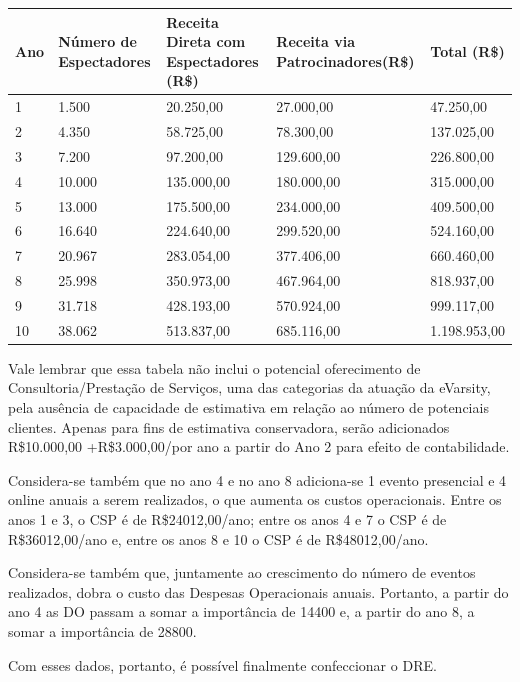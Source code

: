 \documentclass[a4paper, 12pt]{paper}
\begin{document}
\begin{table}[ht]
	\centering
	\begin{tabular}{p{1cm}p{3cm}p{3.5cm}p{3.5cm}p{3cm}}
		\hline
		\cellcolor{gray}Ano&\cellcolor{gray}Número de Espectadores&\cellcolor{gray}Receita Direta com Espectadores (R\$)&\cellcolor{gray}Receita via Patrocinadores(R\$)&\cellcolor{gray}Total (R\$)\\
		\hline
		1&1.500&20.250,00&27.000,00&47.250,00\\
		2&4.350&58.725,00&78.300,00&137.025,00\\
		3&7.200&97.200,00&129.600,00&226.800,00\\	
		4&10.000&135.000,00&180.000,00&315.000,00\\
		5&13.000&175.500,00&234.000,00&409.500,00\\
		6&16.640&224.640,00&299.520,00&524.160,00\\
		7&20.967&283.054,00&377.406,00&660.460,00\\
		8&25.998&350.973,00&467.964,00&818.937,00\\
		9&31.718&428.193,00&570.924,00&999.117,00\\							
		10&38.062&513.837,00&685.116,00&1.198.953,00\\		
		\hline
	\end{tabular}
\end{table}

Vale lembrar que essa tabela não inclui o potencial oferecimento de Consultoria/Prestação de Serviços, uma das categorias da atuação da eVarsity, pela ausência de capacidade de estimativa em relação ao número de potenciais clientes. Apenas para fins de estimativa conservadora, serão adicionados R\$10.000,00 +R\$3.000,00/por ano a partir do Ano 2 para efeito de contabilidade.

Considera-se também que no ano 4 e no ano 8 adiciona-se 1 evento presencial e 4 online anuais a serem realizados, o que aumenta os custos operacionais. Entre os anos 1 e 3, o CSP é de R\$24012,00/ano; entre os anos 4 e 7 o CSP é de R\$36012,00/ano e, entre os anos 8 e 10 o CSP é de R\$48012,00/ano.

Considera-se também que, juntamente ao crescimento do número de eventos realizados, dobra o custo das Despesas Operacionais anuais. Portanto, a partir do ano 4 as DO passam a somar a importância de 14400 e, a partir do ano 8, a somar a importância de 28800. 

Com esses dados, portanto, é possível finalmente confeccionar o DRE.
\end{document}
